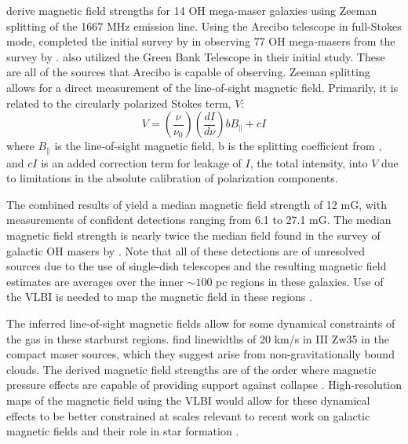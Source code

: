 \citet{robishaw2008_OH_zeeman,mccbride2013_OH_zeeman_survey} derive magnetic field strengths for 14 OH mega-maser galaxies using Zeeman splitting of the 1667 MHz emission line.  Using the Arecibo telescope in full-Stokes mode, \citet{mccbride2013_OH_zeeman_survey} completed the initial survey by \citet{robishaw2008_OH_zeeman} in observing 77 OH mega-masers from the survey by \citet{darling2002_paperIII}. \citet{robishaw2008_OH_zeeman} also utilized the Green Bank Telescope in their initial study. These are all of the sources that Arecibo is capable of observing. Zeeman splitting allows for a direct measurement of the line-of-sight magnetic field. Primarily, it is related to the circularly polarized Stokes term, $V$:
\begin{equation}
\label{eq:stokes_b}
V = \left( \frac{\nu}{\nu_0} \right) \left( \frac{dI}{d\nu} \right) b B_{\mathbin{\parallel}} + cI
\end{equation}
where $B_{\mathbin{\parallel}}$ is the line-of-sight magnetic field, b is the splitting coefficient from \citet{heiles1993}, and $cI$ is an added correction term for leakage of $I$, the total intensity, into $V$ due to limitations in the absolute calibration of polarization components. 

The combined results of \citet{robishaw2008_OH_zeeman,mccbride2013_OH_zeeman_survey} yield a median magnetic field strength of 12 mG, with measurements of confident detections ranging from 6.1 to 27.1 mG. The median magnetic field strength is nearly twice the median field found in the survey of galactic OH masers by \citet{fish2005}. Note that all of these detections are of unresolved sources due to the use of single-dish telescopes and the resulting magnetic field estimates are averages over the inner $\sim 100$ pc regions in these galaxies. Use of the VLBI is needed to map the magnetic field in these regions \citep{robishaw2009}.

The inferred line-of-sight magnetic fields allow for some dynamical constraints of the gas in these starburst regions. \citet{Parra_2005} find linewidths of 20 km/s in III Zw35 in the compact maser sources, which they suggest arise from non-gravitationally bound clouds. The derived magnetic field strengths are of the order where magnetic pressure effects are capable of providing support against collapse \citep{mccbride2013_OH_zeeman_survey}. High-resolution maps of the magnetic field using the VLBI would allow for these dynamical effects to be better constrained at scales relevant to recent work on galactic magnetic fields and their role in star formation \citep[e.g., ]{li2014}.

